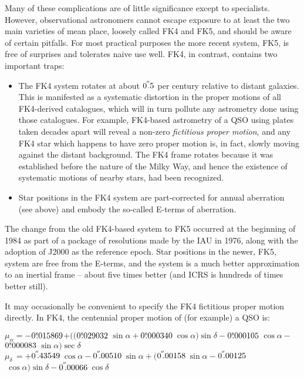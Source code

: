 \documentclass[11pt,twoside]{article}
\newcommand{\arcsec}[2] {\arcseci{#1}$\hspace{-0.4em}.#2$}
\newcommand{\arcsec}[2] {
      {$#1\hspace{-0.05em}^{'\hspace{-0.1em}'}\hspace{-0.4em}.#2$}
   }
\newcommand{\arcseci}[1] {$#1\hspace{-0.05em}$\raisebox{-0.5ex}
                         {$^{'\hspace{-0.1em}'}$}}
\renewcommand{\arcseci}[1] {$#1\hspace{-0.05em}^{'\hspace{-0.1em}'}$}
\newcommand{\tseci}[1]   {$#1$\mbox{$^{\rm s}$}}
\newcommand{\tsec}[2]    {\tseci{#1}$\hspace{-0.3em}.#2$}
\renewcommand{\tsec}[2] {$#1^{\rm s}\hspace{-0.3em}.#2$}
\begin{document}
Many of these complications are of little significance except to
specialists.  However, observational astronomers cannot
escape exposure to at least the two main varieties of
mean place, loosely called
FK4 and FK5, and should be aware of
certain pitfalls.  For most practical purposes the more recent
system, FK5, is free of surprises and tolerates naive
use well.  FK4, in contrast, contains two important traps:
\begin{itemize}
\item The FK4 system rotates at about
      \arcsec{0}{5} per century relative to distant galaxies.
      This is manifested as a systematic distortion in the
      proper motions of all FK4-derived catalogues, which will
      in turn pollute any astrometry done using those catalogues.
      For example, FK4-based astrometry of a QSO using plates
      taken decades apart will reveal a non-zero {\it fictitious proper
      motion}, and any FK4 star which happens to have zero proper
      motion is, in fact, slowly moving against the distant
      background.  The FK4 frame rotates because it was
      established before the nature of the Milky Way, and hence the
      existence of systematic motions of nearby stars, had been
      recognized.
\item Star positions in the FK4 system are part-corrected for
      annual aberration (see above) and embody the so-called
      E-terms of aberration.
\end{itemize}
The change from the old FK4-based system to FK5
occurred at the beginning
of 1984 as part of a package of resolutions made by the IAU in 1976,
along with the adoption of J2000 as the reference epoch.  Star
positions in the newer, FK5, system are free from the E-terms, and
the system is a much better approximation to an
inertial frame -- about five times better (and ICRS is hundreds
of times better still).

It may occasionally be convenient to specify the FK4 fictitious proper
motion directly.  In FK4, the centennial proper motion of (for example)
a QSO is:

$\mu_\alpha=-$\tsec{0}{015869}$
          +(($\tsec{0}{029032}$~\sin \alpha
            +$\tsec{0}{000340}$~\cos \alpha ) \sin \delta
            -$\tsec{0}{000105}$~\cos \alpha
            -$\tsec{0}{000083}$~\sin \alpha ) \sec \delta $ \\
$\mu_\delta\,=+$\arcsec{0}{43549}$~\cos \alpha
              -$\arcsec{0}{00510}$~\sin \alpha +
              ($\arcsec{0}{00158}$~\sin \alpha
              -$\arcsec{0}{00125}$~\cos \alpha ) \sin \delta
              -$\arcsec{0}{00066}$~\cos \delta $
\end{document}
